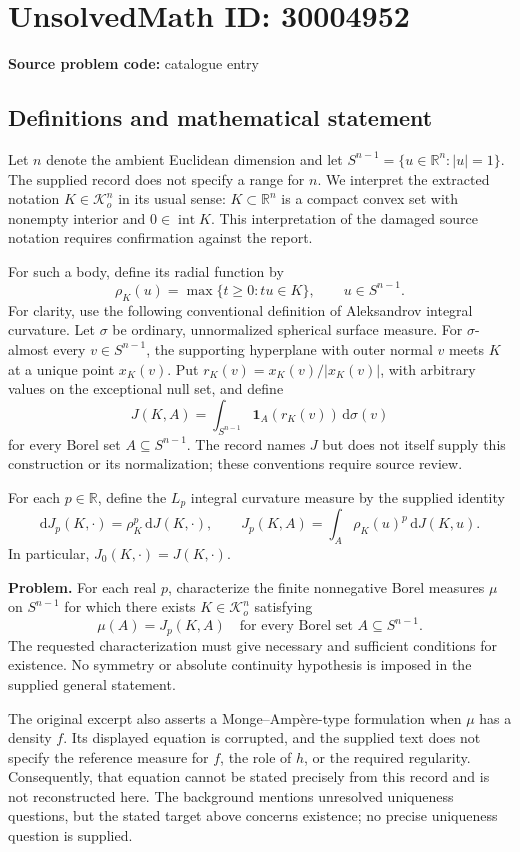 \documentclass[11pt]{article}
\newcommand{\R}{\mathbb{R}}
\begin{document}
\section*{UnsolvedMath ID: 30004952}
\textbf{Source problem code:} catalogue entry
\subsection{Definitions and mathematical statement}
Let \(n\) denote the ambient Euclidean dimension and let \(S^{n-1}=\{u\in\R^n:|u|=1\}\). The supplied record does not specify a range for \(n\). We interpret the extracted notation \(K\in\mathcal K_o^n\) in its usual sense: \(K\subset\R^n\) is a compact convex set with nonempty interior and \(0\in\operatorname{int}K\). This interpretation of the damaged source notation requires confirmation against the report.

For such a body, define its radial function by
\[
\rho_K(u)=\max\{t\geq0:tu\in K\},\qquad u\in S^{n-1}.
\]
For clarity, use the following conventional definition of Aleksandrov integral curvature. Let \(\sigma\) be ordinary, unnormalized spherical surface measure. For \(\sigma\)-almost every \(v\in S^{n-1}\), the supporting hyperplane with outer normal \(v\) meets \(K\) at a unique point \(x_K(v)\). Put \(r_K(v)=x_K(v)/|x_K(v)|\), with arbitrary values on the exceptional null set, and define
\[
J(K,A)=\int_{S^{n-1}}\mathbf 1_A(r_K(v))\,\mathrm d\sigma(v)
\]
for every Borel set \(A\subseteq S^{n-1}\). The record names \(J\) but does not itself supply this construction or its normalization; these conventions require source review.

For each \(p\in\R\), define the \(L_p\) integral curvature measure by the supplied identity
\[
\mathrm dJ_p(K,\cdot)=\rho_K^p\,\mathrm dJ(K,\cdot),
\qquad
J_p(K,A)=\int_A\rho_K(u)^p\,\mathrm dJ(K,u).
\]
In particular, \(J_0(K,\cdot)=J(K,\cdot)\).

\textbf{Problem.} For each real \(p\), characterize the finite nonnegative Borel measures \(\mu\) on \(S^{n-1}\) for which there exists \(K\in\mathcal K_o^n\) satisfying
\[
\mu(A)=J_p(K,A)
\quad\text{for every Borel set }A\subseteq S^{n-1}.
\]
The requested characterization must give necessary and sufficient conditions for existence. No symmetry or absolute continuity hypothesis is imposed in the supplied general statement.

The original excerpt also asserts a Monge--Amp\`ere-type formulation when \(\mu\) has a density \(f\). Its displayed equation is corrupted, and the supplied text does not specify the reference measure for \(f\), the role of \(h\), or the required regularity. Consequently, that equation cannot be stated precisely from this record and is not reconstructed here. The background mentions unresolved uniqueness questions, but the stated target above concerns existence; no precise uniqueness question is supplied.
\end{document}
